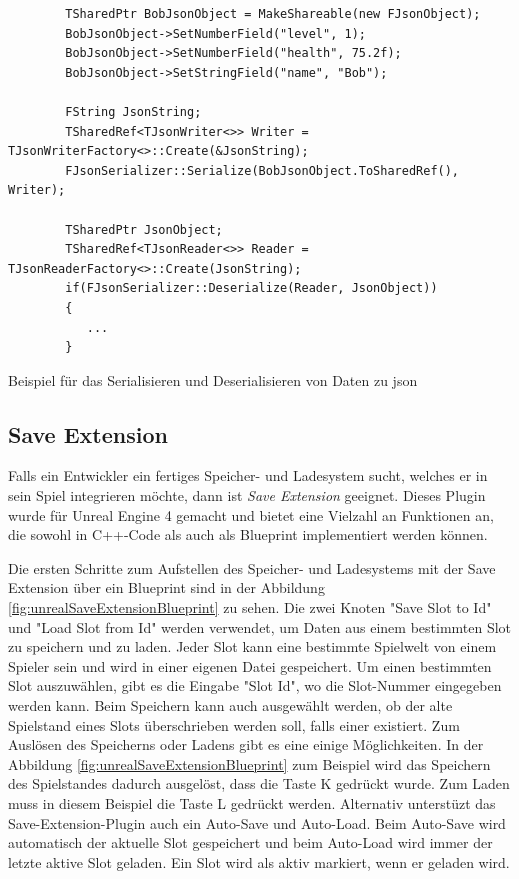 \begin{listing}[htp]
    \begin{verbatim}
        TSharedPtr BobJsonObject = MakeShareable(new FJsonObject);
        BobJsonObject->SetNumberField("level", 1);
        BobJsonObject->SetNumberField("health", 75.2f);
        BobJsonObject->SetStringField("name", "Bob");
        
        FString JsonString;
        TSharedRef<TJsonWriter<>> Writer = TJsonWriterFactory<>::Create(&JsonString);
        FJsonSerializer::Serialize(BobJsonObject.ToSharedRef(), Writer);   
        
        TSharedPtr JsonObject;
        TSharedRef<TJsonReader<>> Reader = TJsonReaderFactory<>::Create(JsonString);
        if(FJsonSerializer::Deserialize(Reader, JsonObject)) 
        {
           ...
        }
    \end{verbatim}
    \caption{Beispiel für das Serialisieren und Deserialisieren von Daten zu \ac{json}}
    \label{lst:unrealFJsonSerializer}
\end{listing}



\subsection{Save Extension}
Falls ein Entwickler ein fertiges Speicher- und Ladesystem sucht, welches er in sein Spiel integrieren möchte, dann ist \textit{Save Extension} geeignet. Dieses Plugin wurde für Unreal Engine 4 gemacht und bietet eine Vielzahl an Funktionen an, die sowohl in C++-Code als auch als Blueprint implementiert werden können.\cite{unrealengineSaveExtension}

Die ersten Schritte zum Aufstellen des Speicher- und Ladesystems mit der Save Extension über ein Blueprint sind in der Abbildung \ref{fig:unrealSaveExtensionBlueprint} zu sehen. Die zwei Knoten "Save Slot to Id" und "Load Slot from Id" werden verwendet, um Daten aus einem bestimmten Slot zu speichern und zu laden. Jeder Slot kann eine bestimmte Spielwelt von einem Spieler sein und wird in einer eigenen Datei gespeichert.\cite{piperiftPiperiftSaveSlot} Um einen bestimmten Slot auszuwählen, gibt es die Eingabe "Slot Id", wo die Slot-Nummer eingegeben werden kann. Beim Speichern kann auch ausgewählt werden, ob der alte Spielstand eines Slots überschrieben werden soll, falls einer existiert. Zum Auslösen des Speicherns oder Ladens gibt es eine einige Möglichkeiten. In der Abbildung \ref{fig:unrealSaveExtensionBlueprint} zum Beispiel wird das Speichern des Spielstandes dadurch ausgelöst, dass die Taste K gedrückt wurde. Zum Laden muss in diesem Beispiel die Taste L gedrückt werden. Alternativ unterstüzt das Save-Extension-Plugin auch ein Auto-Save und Auto-Load. Beim Auto-Save wird automatisch der aktuelle Slot gespeichert und beim Auto-Load wird immer der letzte aktive Slot geladen. Ein Slot wird als aktiv markiert, wenn er geladen wird.\cite{piperiftPiperiftSaveSlot}\cite{piperiftPiperiftSaveBlueprint} 

